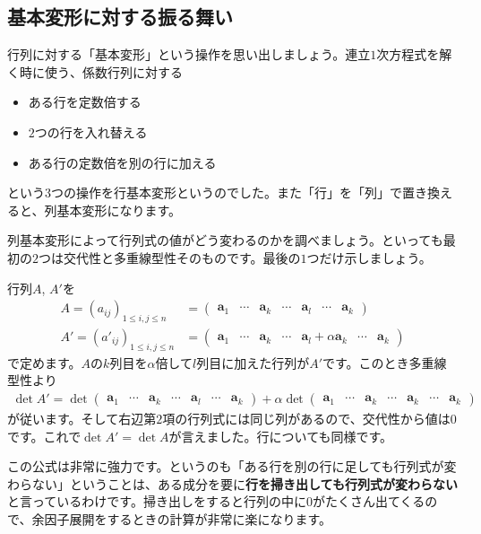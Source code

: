 \subsection{基本変形に対する振る舞い}

行列に対する「基本変形」という操作を思い出しましょう。連立$1$次方程式を解く時に使う、係数行列に対する
\begin{itemize}
\item ある行を定数倍する
\item $2$つの行を入れ替える
\item ある行の定数倍を別の行に加える
\end{itemize}
という$3$つの操作を行基本変形というのでした。また「行」を「列」で置き換えると、列基本変形になります。

列基本変形によって行列式の値がどう変わるのかを調べましょう。といっても最初の$2$つは交代性と多重線型性そのものです。最後の$1$つだけ示しましょう。

行列$A$, $A'$を
\begin{align*}
A = (a_{ij})_{1 \leq i, j \leq n}
&= \begin{pmatrix}
\bm{a}_1 & \cdots & \bm{a}_k & \cdots & \bm{a}_l & \cdots & \bm{a}_k
\end{pmatrix} \\
A' = (a'_{ij})_{1 \leq i, j \leq n}
&= \begin{pmatrix}
\bm{a}_1 & \cdots & \bm{a}_k & \cdots & \bm{a}_l + \alpha \bm{a}_k & \cdots & \bm{a}_k
\end{pmatrix}
\end{align*}
で定めます。$A$の$k$列目を$\alpha$倍して$l$列目に加えた行列が$A'$です。このとき多重線型性より
\begin{align*}
\det A'
= \det \begin{pmatrix}
\bm{a}_1 & \cdots & \bm{a}_k & \cdots & \bm{a}_l & \cdots & \bm{a}_k
\end{pmatrix}
+ \alpha \det 
\begin{pmatrix}
\bm{a}_1 & \cdots & \bm{a}_k & \cdots & \bm{a}_k & \cdots & \bm{a}_k
\end{pmatrix}\end{align*}
が従います。そして右辺第$2$項の行列式には同じ列があるので、交代性から値は$0$です。これで$\det A' = \det A$が言えました。行についても同様です。

この公式は非常に強力です。というのも「ある行を別の行に足しても行列式が変わらない」ということは、ある成分を要に\textbf{行を掃き出しても行列式が変わらない}と言っているわけです。掃き出しをすると行列の中に$0$がたくさん出てくるので、余因子展開をするときの計算が非常に楽になります。

